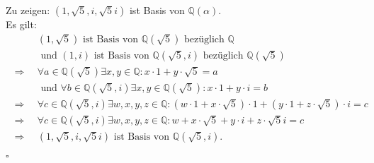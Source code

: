 \documentclass[12pt]{article}
\newcommand{\QED}{\begin{flushright} $\square$ \end{flushright}}
\newcommand{\df}{\enspace\Longrightarrow\enspace}
\begin{document}
\begin{enumerate}
	Zu zeigen: $(1,\sqrt{5},i,\sqrt{5}i)$ ist Basis von $\mathbb{Q}(\alpha)$. \\
	Es gilt:
	\begin{align*}
		&(1,\sqrt{5})\text{ ist Basis von }\mathbb{Q}(\sqrt{5})\text{ bezüglich }\mathbb{Q} \\
		&\text{ und }(1,i)\text{ ist Basis von }\mathbb{Q}(\sqrt{5},i)\text{ bezüglich }\mathbb{Q}(\sqrt{5}) \\
		\df&\forall a\in\mathbb{Q}(\sqrt{5})\exists x,y\in\mathbb{Q}:x\cdot1+y\cdot\sqrt{5}=a \\
		&\text{ und }\forall b\in\mathbb{Q}(\sqrt{5},i)\exists x,y\in\mathbb{Q}(\sqrt{5}):x\cdot1+y\cdot i=b \\
		\df&\forall c\in\mathbb{Q}(\sqrt{5},i)\exists w,x,y,z\in\mathbb{Q}:(w\cdot1+x\cdot\sqrt{5})\cdot1+(y\cdot1+z\cdot\sqrt{5})\cdot i=c \\
		\df&\forall c\in\mathbb{Q}(\sqrt{5},i)\exists w,x,y,z\in\mathbb{Q}:w+x\cdot\sqrt{5}+y\cdot i+z\cdot\sqrt{5}i=c \\
		\df&(1,\sqrt{5},i,\sqrt{5}i)\text{ ist Basis von }\mathbb{Q}(\sqrt{5},i).
	\end{align*}
	\QED
\end{enumerate}
\end{document}
